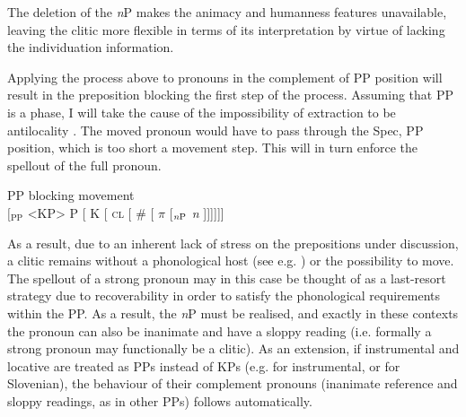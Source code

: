\documentclass[output=paper,colorlinks,citecolor=brown]{langscibook}
\begin{document}
The deletion of the \textit{n}P makes the animacy and humanness features unavailable, leaving the clitic more flexible in terms of its interpretation by virtue of lacking the individuation information. 

\newpage
Applying the process above to pronouns in the complement of PP position will result in the preposition blocking the first step of the process. Assuming that PP is a phase, I will take the cause of the impossibility of extraction to be antilocality \citep{abels-phases,milicevbeslin19}. The moved pronoun would have to pass through the Spec, PP position, which is too short a movement step. This will in turn enforce the spellout of the full pronoun.  

\ea \label{derivpronmovementblockPp} PP blocking movement \\
$[$$_\text{PP}$ <KP> P [ K [ \textsc{cl} [ \# [ $\pi$ [$_\text{\textit{n}P}$ \textit{n} ]]]]]]
\z\medskip


\noindent As a result, due to an inherent lack of stress on the prepositions under discussion, a clitic remains without a phonological host (see e.g. \citealt{talic18}) or the possibility to move.  The spellout of a strong pronoun may in this case be thought of as a last-resort strategy due to recoverability in order to satisfy the phonological requirements within the PP. As a result, the \textit{n}P must be realised, and exactly in these contexts the pronoun can also be inanimate and have a sloppy reading  (i.e. formally a strong pronoun may functionally be a clitic). As an extension, if instrumental and locative are treated as PPs instead of KPs (e.g. \citealt{milicevbeslin19} for instrumental, or \citealt{stegovec19} for Slovenian), the behaviour of their complement pronouns (inanimate reference and sloppy readings, as in other PPs) follows automatically. 
\end{document}
